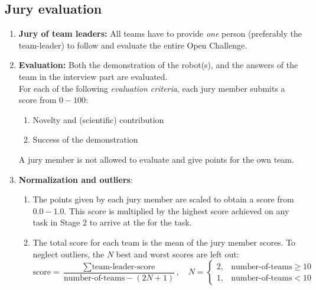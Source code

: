 \OpenDemonstrationChanges

\subsection{Jury evaluation}
\begin{enumerate}
  \item \textbf{Jury of team leaders:} All teams have to provide \emph{one} person 
  (preferably the team-leader) to follow and evaluate the entire Open Challenge.
  \item \textbf{Evaluation:} Both the demonstration of the robot(s), and the answers of the team in the interview part are evaluated.\\ 
  For each of the following \emph{evaluation criteria}, each jury member submits a score from $0-100$:
  \begin{enumerate}
  \item Novelty and (scientific) contribution
  \item Success of the demonstration 
  \end{enumerate}
  A jury member is not allowed to evaluate and give points for the own team.
  \item \textbf{Normalization and outliers}: 
  \begin{enumerate}
    \item The points given by each jury member are scaled to obtain a score from $0.0-1.0$. This score is multiplied by the highest score achieved on any task in Stage 2 to arrive at the  for the task. 
    \item The total score for each team is the mean of the jury member scores.
      To neglect outliers, the $N$ best and worst scores are left out:
      $$\mbox{score} = \frac{\sum\mbox{team-leader-score}}{\mbox{number-of-teams} - (2N+1)},
      \quad N=\begin{cases}2, & \mbox{number-of-teams} \ge 10\\1, & \mbox{number-of-teams} < 10 \end{cases}$$
    \end{enumerate}
\end{enumerate}

